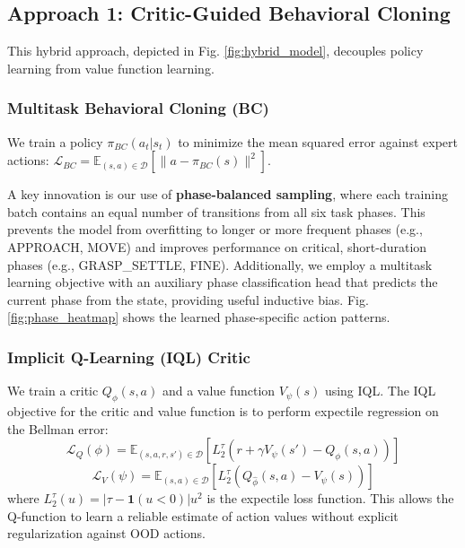 \documentclass[conference]{IEEEtran}
\begin{document}
\subsection{Approach 1: Critic-Guided Behavioral Cloning}

This hybrid approach, depicted in Fig. \ref{fig:hybrid_model}, decouples policy learning from value function learning.

\subsubsection{Multitask Behavioral Cloning (BC)}
We train a policy $\pi_{BC}(a_t | s_t)$ to minimize the mean squared error against expert actions: $\mathcal{L}_{BC} = \mathbb{E}_{(s,a) \in \mathcal{D}} [\| a - \pi_{BC}(s) \|^2]$. 

A key innovation is our use of \textbf{phase-balanced sampling}, where each training batch contains an equal number of transitions from all six task phases. This prevents the model from overfitting to longer or more frequent phases (e.g., APPROACH, MOVE) and improves performance on critical, short-duration phases (e.g., GRASP\_SETTLE, FINE). Additionally, we employ a multitask learning objective with an auxiliary phase classification head that predicts the current phase from the state, providing useful inductive bias. Fig. \ref{fig:phase_heatmap} shows the learned phase-specific action patterns.

\subsubsection{Implicit Q-Learning (IQL) Critic}
We train a critic $Q_\phi(s, a)$ and a value function $V_\psi(s)$ using IQL. The IQL objective for the critic and value function is to perform expectile regression on the Bellman error:
\begin{equation}
    \mathcal{L}_{Q}(\phi) = \mathbb{E}_{(s,a,r,s') \in \mathcal{D}} [L_2^\tau(r + \gamma V_\psi(s') - Q_\phi(s,a))]
\end{equation}
\begin{equation}
    \mathcal{L}_{V}(\psi) = \mathbb{E}_{(s,a) \in \mathcal{D}} [L_2^\tau(Q_{\hat{\phi}}(s,a) - V_\psi(s))]
\end{equation}
where $L_2^\tau(u) = |\tau - \mathbf{1}(u<0)|u^2$ is the expectile loss function. This allows the Q-function to learn a reliable estimate of action values without explicit regularization against OOD actions.
\end{document}

